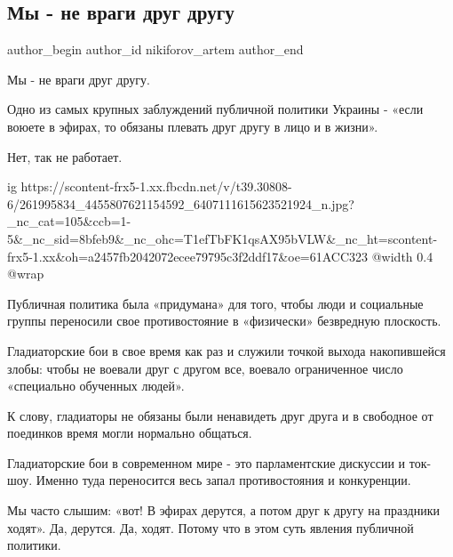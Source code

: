  
 
 
 
 
 
\subsection{Мы - не враги друг другу}
\label{sec:28_11_2021.fb.nikiforov_artem.1.my_ne_vragi}
 
\ifcmt
 author_begin
   author_id nikiforov_artem
 author_end
\fi

Мы - не враги друг другу.

Одно из самых крупных заблуждений публичной политики Украины - «если воюете в
эфирах, то обязаны плевать друг другу в лицо и в жизни».

Нет, так не работает. 

\ifcmt
  ig https://scontent-frx5-1.xx.fbcdn.net/v/t39.30808-6/261995834_4455807621154592_6407111615623521924_n.jpg?_nc_cat=105&ccb=1-5&_nc_sid=8bfeb9&_nc_ohc=T1efTbFK1qsAX95bVLW&_nc_ht=scontent-frx5-1.xx&oh=a2457fb2042072ecee79795c3f2ddf17&oe=61ACC323
  @width 0.4
  @wrap 
\fi

Публичная политика была «придумана» для того, чтобы люди и социальные группы
переносили свое противостояние в «физически» безвредную плоскость.

Гладиаторские бои в свое время как раз и служили точкой выхода накопившейся
злобы: чтобы не воевали друг с другом все, воевало ограниченное число
«специально обученных людей».

К слову, гладиаторы не обязаны были ненавидеть друг друга и в свободное от
поединков время могли нормально общаться. 

Гладиаторские бои в современном мире - это парламентские дискуссии и ток-шоу.
Именно туда переносится весь запал противостояния и конкуренции. 

Мы часто слышим: «вот! В эфирах дерутся, а потом друг к другу на праздники
ходят». Да, дерутся. Да, ходят. Потому что в этом суть явления публичной
политики. 

